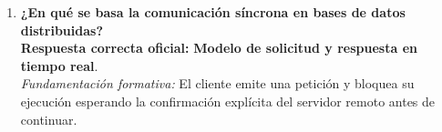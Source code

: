 \documentclass[11pt,a4paper]{article}
\begin{document}
\begin{enumerate}[label=\textbf{Pregunta \arabic*.}]
    \item \textbf{¿En qué se basa la comunicación síncrona en bases de datos distribuidas?}\\
    \textbf{Respuesta correcta oficial:} \textbf{Modelo de solicitud y respuesta en tiempo real}.\\
    \textit{Fundamentación formativa:} El cliente emite una petición y bloquea su ejecución esperando la confirmación explícita del servidor remoto antes de continuar.
\end{enumerate}

\printbibliography[heading=bibintoc, title={Referencias Bibliográficas}]
\end{document}
